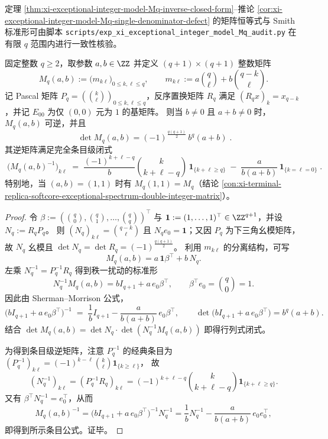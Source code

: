 \begin{remark}[审计脚本]\label{rem:xi-exceptional-integer-model-Mq-audit-script}
定理 \ref{thm:xi-exceptional-integer-model-Mq-inverse-closed-form}--推论 \ref{cor:xi-exceptional-integer-model-Mq-single-denominator-defect} 的矩阵恒等式与 Smith 标准形可由脚本 \texttt{scripts/exp\_xi\_exceptional\_integer\_model\_Mq\_audit.py} 在有限 \(q\) 范围内进行一致性核验。
\end{remark}
\begin{conclusion}\label{con:xi-terminal-replica-softcore-mq-ab-inverse-det}
固定整数 \(q\ge 2\)，取参数 \(a,b\in\ZZ\) 并定义 \((q+1)\times(q+1)\) 整数矩阵
\[
M_q(a,b):=\bigl(m_{k\ell}\bigr)_{0\le k,\ell\le q},
\qquad
m_{k\ell}:=a\binom{q}{\ell}+b\binom{q-k}{\ell}.
\]
记 Pascal 矩阵 \(P_q=(\binom{k}{\ell})_{0\le k,\ell\le q}\)，反序置换矩阵 \(R_q\) 满足 \((R_qx)_k=x_{q-k}\)，并记 \(E_{00}\) 为仅 \((0,0)\) 元为 \(1\) 的基矩阵。
则当 \(b\neq 0\) 且 \(a+b\neq 0\) 时，\(M_q(a,b)\) 可逆，并且
\[
\boxed{\;
\det M_q(a,b)=(-1)^{\frac{q(q+1)}{2}}\,b^{q}(a+b)\;} .
\]
其逆矩阵满足完全条目级闭式
\[
\boxed{\;
\bigl(M_q(a,b)^{-1}\bigr)_{k\ell}
\;=\;
\frac{(-1)^{k+\ell-q}}{b}\binom{k}{k+\ell-q}\,\mathbf 1_{\{k+\ell\ge q\}}
\;-\;\frac{a}{b(a+b)}\,\mathbf 1_{\{k=\ell=0\}}\;} .
\]
特别地，当 \((a,b)=(1,1)\) 时有 \(M_q(1,1)=M_q\)（结论 \ref{con:xi-terminal-replica-softcore-exceptional-spectrum-double-integer-matrix}）。
\end{conclusion}
\begin{proof}
令 \(\beta:=(\binom{q}{0},\binom{q}{1},\dots,\binom{q}{q})^{\top}\) 与 \(\mathbf{1}:=(1,\dots,1)^{\top}\in\ZZ^{q+1}\)，并设
\(
N_q:=R_qP_q
\)。
则 \((N_q)_{k\ell}=\binom{q-k}{\ell}\) 且 \(N_qe_0=\mathbf{1}\)；又因 \(P_q\) 为下三角幺模矩阵，故 \(N_q\) 幺模且
\(
\det N_q=\det R_q=(-1)^{\frac{q(q+1)}{2}}
\)。
利用 \(m_{k\ell}\) 的分离结构，可写
\[
M_q(a,b)=a\,\mathbf{1}\beta^{\top}+b\,N_q.
\]
左乘 \(N_q^{-1}=P_q^{-1}R_q\) 得到秩一扰动的标准形
\[
N_q^{-1}M_q(a,b)=bI_{q+1}+a\,e_0\beta^{\top},
\qquad
\beta^{\top}e_0=\binom{q}{0}=1.
\]
因此由 Sherman--Morrison 公式，
\[
\bigl(bI_{q+1}+a\,e_0\beta^{\top}\bigr)^{-1}
\;=\;
\frac1bI_{q+1}-\frac{a}{b(a+b)}\,e_0\beta^{\top},
\qquad
\det\!\bigl(bI_{q+1}+a\,e_0\beta^{\top}\bigr)=b^{q}(a+b).
\]
结合 \(\det M_q(a,b)=\det N_q\cdot \det(N_q^{-1}M_q(a,b))\) 即得行列式闭式。
\par
为得到条目级逆矩阵，注意 \(P_q^{-1}\) 的经典条目为
\(
(P_q^{-1})_{k\ell}=(-1)^{k-\ell}\binom{k}{\ell}\mathbf 1_{\{k\ge \ell\}}
\)，
故
\[
(N_q^{-1})_{k\ell}=(P_q^{-1}R_q)_{k\ell}
=(-1)^{k+\ell-q}\binom{k}{k+\ell-q}\mathbf 1_{\{k+\ell\ge q\}}.
\]
又有 \(\beta^{\top}N_q^{-1}=e_0^{\top}\)，从而
\[
M_q(a,b)^{-1}
=\bigl(bI_{q+1}+a\,e_0\beta^{\top}\bigr)^{-1}N_q^{-1}
=\frac1bN_q^{-1}-\frac{a}{b(a+b)}\,e_0e_0^{\top},
\]
即得到所示条目公式。证毕。
\end{proof}

